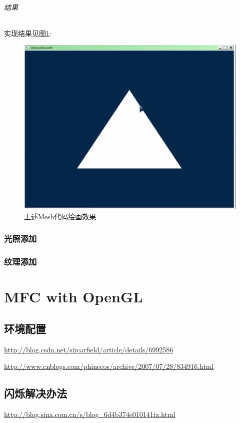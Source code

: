 \documentclass[UTF8,a4paper,12pt]{ctexbook}
\begin{document}
		\subparagraph{结果}
			实现结果见图\ref{VAOResult}:
			\begin{figure}[h]
				\centering
				\includegraphics[scale = 0.5]{VBOMeshResult.png}
				\caption{上述Mesh代码绘画效果}
				\label{VAOResult}
			\end{figure}
	
	\subsection{光照添加}
	
	\subsection{纹理添加}
		

\chapter{MFC with OpenGL}
	\section{环境配置}
		\url{http://blog.csdn.net/sircarfield/article/details/6992586}
		
		\url{http://www.cnblogs.com/phinecos/archive/2007/07/28/834916.html}
		
	\section{闪烁解决办法}
		\url{http://blog.sina.com.cn/s/blog_6d4b374e010141ix.html}
		    
\end{document}
